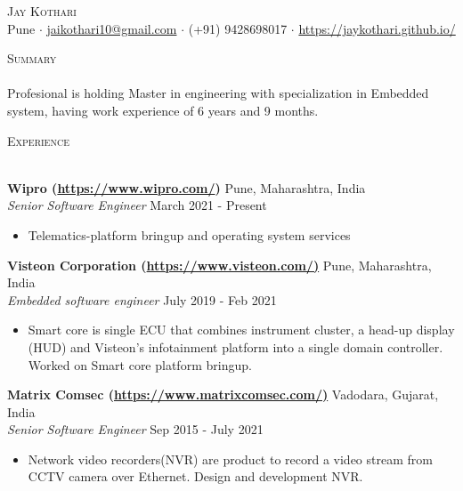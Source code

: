 \documentclass[a4paper]{article}
\newcommand{\lineunder} {
    \vspace*{-8pt} \\
    \hspace*{-18pt} \hrulefill \\
}
\newcommand{\header} [1] {
    {\hspace*{-18pt}\vspace*{6pt} \textsc{#1}}
    \vspace*{-6pt} \lineunder
}
\begin{document}
\vspace*{-40pt}

    

\vspace*{-10pt}
\begin{center}
	{\Huge \scshape {Jay Kothari}}\\
	Pune $\cdot$ \url{jaikothari10@gmail.com} $\cdot$ (+91) 9428698017 $\cdot$ \url{https://jaykothari.github.io/}\\
\end{center}

\header{Summary}
\vspace{1mm}
Profesional is holding Master in engineering with specialization in Embedded system, having work experience of 6 years and 9 months.
\vspace{2mm}

\header{Experience}
\vspace{1mm}

\textbf{Wipro (\url{https://www.wipro.com/})} \hfill Pune, Maharashtra, India\\
\textit{Senior Software Engineer} \hfill March 2021 - Present\\
\vspace{-1mm}
\begin{itemize} \itemsep 1pt
	\item Telematics-platform bringup and operating system services
\end{itemize}

\textbf{Visteon Corporation (\url{https://www.visteon.com/)}} \hfill Pune, Maharashtra, India\\
\textit{Embedded software engineer} \hfill July 2019 - Feb 2021\\
\vspace{-1mm}
\begin{itemize} \itemsep 1pt
	\item Smart core is single ECU that combines instrument cluster, a head-up display (HUD) and Visteon’s infotainment platform into a single domain controller. Worked on Smart core platform bringup. 
\end{itemize}

\textbf{Matrix Comsec (\url{https://www.matrixcomsec.com/)}} \hfill Vadodara, Gujarat, India\\
\textit{Senior Software Engineer} \hfill Sep 2015 - July 2021\\
\vspace{-1mm}
\begin{itemize} \itemsep 1pt
	\item Network video recorders(NVR) are product to record a video stream from CCTV camera over Ethernet. Design and development NVR.
\end{itemize}
\end{document}
